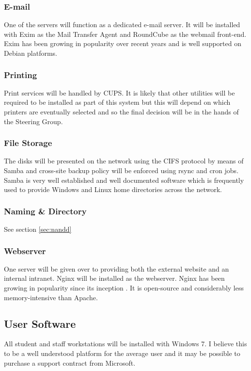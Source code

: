 \documentclass[a4paper, twoside]{article}
\begin{document}
\subsubsection{E-mail}
One of the servers will function as a dedicated e-mail server. It will be
installed with Exim as the Mail Transfer Agent and RoundCube as the webmail
front-end. Exim has been growing in popularity over recent years and is well
supported on Debian platforms\cite{exim}.

\subsubsection{Printing}
Print services will be handled by CUPS. It is likely that other utilities will
be required to be installed as part of this system but this will depend on which
printers are eventually selected and so the final decision will be in the hands
of the Steering Group.

\subsubsection{File Storage}
The disks will be presented on the network using the CIFS protocol by means of
Samba and cross-site backup policy will be enforced using rsync and cron jobs.
Samba is very well established and well documented software which is frequently
used to provide Windows and Linux home directories across the network.

\subsubsection{Naming \& Directory}
See section \ref{sec:nandd}

\subsubsection{Webserver}
One server will be given over to providing both the external website and an
internal intranet. Nginx will be installed as the webserver. Nginx has been
growing in popularity since its inception \cite{nginx}. It is open-source and
considerably less memory-intensive than Apache.

\subsection{User Software}
All student and staff workstations will be installed with Windows 7. I believe
this to be a well understood platform for the average user and it may be
possible to purchase a support contract from Microsoft.
\end{document}

